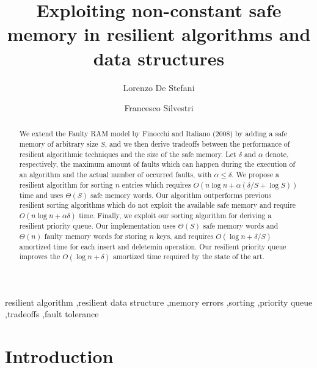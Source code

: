 \documentclass[review,number]{elsarticle}
\newcommand{\BO}[1]{{O}\left(#1\right)}
\newcommand{\BT}[1]{{\Theta}\left(#1\right)}
\begin{document}
\begin{frontmatter}
\title{Exploiting non-constant safe memory in resilient algorithms and data structures}

\author{Lorenzo De Stefani}
\author{Francesco Silvestri}


\address[dei]{Dipartimento di Ingegneria dell'Informazione, University of Padova
\\ Via Gradenigo 6/B, I-35131 Padova, Italy\\
\{destefan,silvest1\}@dei.unipd.it}


\begin{abstract}
We extend the Faulty RAM model by Finocchi and Italiano (2008) by adding a safe
memory of arbitrary size $S$, and we then derive tradeoffs between the
performance of resilient algorithmic techniques and the size of the safe memory.
Let $\delta$ and $\alpha$ denote, respectively, the maximum amount of faults
which can happen during the execution of an algorithm and the actual number of
occurred faults, with $\alpha \leq \delta$. We propose a resilient algorithm for
sorting  $n$ entries which requires $\BO{n\log n+\alpha (\delta/S +  \log S)}$
time and uses $\BT{S}$ safe memory words. Our algorithm outperforms previous
resilient sorting algorithms which do not exploit the available safe memory and
require $\BO{n\log n+ \alpha\delta}$ time. Finally, we exploit our sorting
algorithm for deriving a resilient priority queue.  Our implementation uses
$\BT{S}$ safe memory words and $\BT{n}$ faulty memory words for storing $n$
keys, and requires $\BO{\log n + \delta/S}$ amortized time for each insert and
deletemin operation. Our resilient priority queue improves the $\BO{\log n +
\delta}$ amortized time required by the state of the art.
\end{abstract}

\begin{keyword}
resilient algorithm \sep resilient data structure \sep memory errors 
\sep sorting  \sep priority queue \sep tradeoffs \sep fault tolerance
\end{keyword}

\end{frontmatter}

\section{Introduction}
\end{document}
